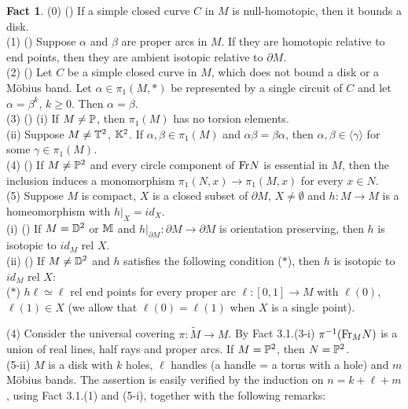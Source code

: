 \documentclass[11pt]{amsart}
\theoremstyle{definition}
\newtheorem{fact}{Fact}[section]
\newtheorem*{Proof of Theorem 3.1}{Proof of Theorem 3.1}
\newtheorem*{Proof of Corollary 3.1}{Proof of Corollary 3.1}
\newtheorem*{Proof of Proposition 4.1.(1)}{Proof of Proposition 4.1.(1)}
\newtheorem*{Proof of Proposition 4.1.(2)}{Proof of Proposition 4.1.(2)}
\newtheorem*{Proof of Corollary 1.1}{Proof of Corollary 1.1}
\begin{document}
\begin{fact}
(0) (\cite[Theorem 1.7]{Ep}) If a simple closed curve $C$ in $M$ is null-homotopic, then it bounds a disk.  \\
(1) (\cite[Theorem 3.1]{Ep}) Suppose $\alpha$ and $\beta$ are proper arcs in $M$. If they are homotopic relative to end points, then they are ambient isotopic relative to $\partial M$.  \\
(2) (\cite[Theorem 4.2]{Ep}) Let $C$ be a simple closed curve in $M$, which does not bound a disk or a M\"obius band. Let $\alpha \in \pi_1(M,\ast)$ be represented by a single circuit of $C$ and let $\alpha = \beta^k$, $k \geq 0$. Then $\alpha = \beta$.  \\
(3) (\cite[Lemma 4.3]{Ep}) (i) If $M \neq {\Bbb P}$, then $\pi_1(M)$ has no torsion elements.\\
(ii) Suppose $M \neq {\Bbb T}^2$, ${\Bbb K}^2$. If $\alpha, \beta \in \pi_1(M)$ and $\alpha \beta = \beta \alpha$, then $\alpha, \beta \in \langle \gamma \rangle$ for some $\gamma \in \pi_1(M)$. \\
(4) (\cite[p101, lines 5 -10]{Ep}) If $M \neq {\Bbb P}^2$ and every circle component of ${\rm Fr}N$ is essential in $M$, then the inclusion induces a monomorphism $\pi_1(N, x) \to \pi_1(M, x)$ for every $x \in N$.  \\
(5) Suppose $M$ is compact, $X$ is a closed subset of $\partial M$, $X \neq \emptyset$ and $h : M \to M$ is a homeomorphism with $h|_X = id_X$. \\
(i) (\cite[Theorem 3.4]{Ep}) If $M = {\Bbb D}^2$ or ${\Bbb M}$ and $h|_{\partial M} : \partial M \to \partial M$ is orientation preserving, then $h$ is isotopic to $id_M$ rel $X$.  \\
(ii) (\cite[Proof of Theorem 6.3]{Ep}) If $M \neq {\Bbb D}^2$ and $h$ satisfies the following condition ($\ast$), then $h$ is isotopic to $id_M$ rel $X$: \\
($\ast$) $h\ell \simeq \ell$ rel end points for every proper arc $\ell : [0, 1] \to M$ with $\ell(0)$, $\ell(1) \in X$ (we allow that $\ell(0) = \ell(1)$ when $X$ is a single point). 
\end{fact}
\vskip 2mm 
(4) Consider the universal covering $\pi: \tilde{M} \to M$. By Fact 3.1.(3-i) $\pi^{-1}({\rm Fr}_M N)$ is a union of real lines, half rays and proper arcs. If $M = {\Bbb P}^2$, then $N = {\Bbb P}^2$. \\
(5-ii) $M$ is a disk with $k$ holes, $\ell$ handles (a handle = a torus with a hole) and $m$ M\"obius bands. The assertion is easily verified by the induction on $n = k + \ell + m$, using Fact 3.1.(1) and (5-i), together with the following remarks: \\
\end{document}

